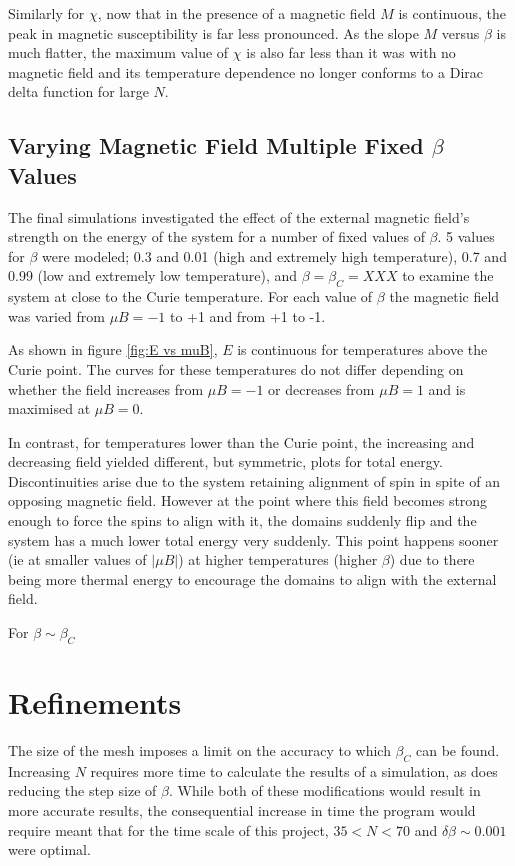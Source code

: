 \documentclass[11pt]{article}   	%
\begin{document}
Similarly for $\chi$, now that in the presence of a magnetic field $M$ is continuous, the peak in magnetic susceptibility is far less pronounced. As the slope $M$ versus $\beta$ is much flatter, the maximum value of $\chi$ is also far less than it was with no magnetic field and its temperature dependence no longer conforms to a Dirac delta function for large $N$.

\subsection{Varying Magnetic Field Multiple Fixed $\beta$ Values}
The final simulations investigated the effect of the external magnetic field's strength on the energy of the system for a number of fixed values of $\beta$. 5 values for $\beta$ were modeled; 0.3 and 0.01 (high and extremely high temperature), 0.7 and 0.99 (low and extremely low temperature), and $\beta = \beta_C = XXX$ to examine the system at close to the Curie temperature. For each value of $\beta$ the magnetic field was varied from $\mu B = -1$ to +1 and from +1 to -1.

As shown in figure \ref{fig:E vs muB}, $E$ is continuous for temperatures above the Curie point. The curves for these temperatures do not differ depending on whether the field increases from $\mu B = -1$ or decreases from $\mu B = 1$ and is maximised at $\mu B = 0$.

In contrast, for temperatures lower than the Curie point, the increasing and decreasing field yielded different, but symmetric, plots for total energy. Discontinuities arise due to the system retaining alignment of spin in spite of an opposing magnetic field. However at the point where this field becomes strong enough to force the spins to align with it, the domains suddenly flip and the system has a much lower total energy very suddenly. This point happens sooner (ie at smaller values of $\left|\mu B\right|$) at higher temperatures (higher $\beta$) due to there being more thermal energy to encourage the domains to align with the external field.

For $\beta \sim \beta_C$

\section{Refinements}
The size of the mesh imposes a limit on the accuracy to which $\beta_C$ can be found. Increasing $N$ requires more time to calculate the results of a simulation, as does reducing the step size of $\beta$. While both of these modifications would result in more accurate results, the consequential increase in time the program would require meant that for the time scale of this project, $35 < N < 70$ and $\delta \beta \sim 0.001$ were optimal.
\end{document}

